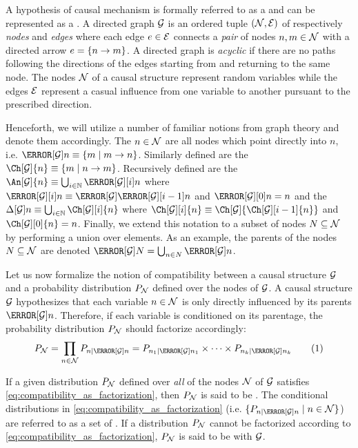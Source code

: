 \documentclass[aps, 10pt, english, twoside, pra, nofootinbib, tightenlines, longbibliography, superscriptaddress]{revtex4-1}
\begin{document}
    A hypothesis of causal mechanism is formally referred to as a  and can be represented as a . A directed graph $\mathcal{G}$ is an ordered tuple $\br{\nodes, \edges}$ of respectively \textit{nodes} and \textit{edges} where each edge $e \in \mathcal{E}$ connects a \textit{pair} of nodes $n, m \in \mathcal{N}$ with a directed arrow $e = \bc{n \to m}$. A directed graph is \textit{acyclic} if there are no paths following the directions of the edges starting from and returning to the same node. The nodes $\mathcal{N}$ of a causal structure represent random variables while the edges $\mathcal{E}$ represent a casual influence from one variable to another pursuant to the prescribed direction.

    Henceforth, we will utilize a number of familiar notions from graph theory and denote them accordingly. The  $n \in \mathcal{N}$ are all nodes which point directly into $n$, i.e. $\Pa[\graph]{n} \defined \bc{m \mid m \to n}$. Similarly defined are the  $\Ch[\graph]{n} \defined \bc{m \mid n \to m}$. Recursively defined are the  $\An[\graph]{n} \defined \bigcup_{i\in\mathbb{N}} \Pa[\graph][i]{n}$ where $\Pa[\graph][i]{n} \defined \Pa[\graph]{\Pa[\graph][i-1]{n}}$ and $\Pa[\graph][0]{n} = n$ and the  $\De[\graph]{n} \defined \bigcup_{i\in\mathbb{N}} \Ch[\graph][i]{n}$ where $\Ch[\graph][i]{n} \defined \Ch[\graph]{\Ch[\graph][i-1]{n}}$ and $\Ch[\graph][0]{n} = n$. Finally, we extend this notation to a subset of nodes $N \subseteq \mathcal{N}$ by performing a union over elements. As an example, the parents of the nodes $N \subseteq \mathcal{N}$ are denoted $\Pa[\graph]{N} = \bigcup_{n \in N} \Pa[\graph]{n}$.

    Let us now formalize the notion of compatibility between a causal structure $\mathcal{G}$ and a probability distribution $\prob[\nodes]$ defined over the nodes of $\mathcal{G}$. A causal structure $\mathcal{G}$ hypothesizes that each variable $n \in \mathcal{N}$ is only directly influenced by its parents $\Pa[\graph]{n}$. Therefore, if each variable is conditioned on its parentage, the probability distribution $\prob[\nodes]$ should factorize accordingly:
    \[ \prob[\nodes] = \prod_{n \in \nodes} \prob[n \mid \Pa[\graph]{n}] = \prob[n_1 \mid \Pa[\graph]{n_1}] \times \cdots \times \prob[n_k \mid \Pa[\graph]{n_k}] \eq \label{eq:compatibility_as_factorization}\]

    If a given distribution $\prob[\nodes]$ defined over \textit{all} of the nodes $\mathcal{N}$ of $\mathcal{G}$ satisfies \cref{eq:compatibility_as_factorization}, then $\prob[\nodes]$ is said to be . The conditional distributions in \cref{eq:compatibility_as_factorization} (i.e. $\{\prob[n \mid \Pa[\graph]{n}] \mid n \in \nodes\}$) are referred to as a set of . If a distribution $\prob[\nodes]$ cannot be factorized according to \cref{eq:compatibility_as_factorization}, $\prob[\nodes]$ is said to be  with $\mathcal{G}$.
\end{document}
